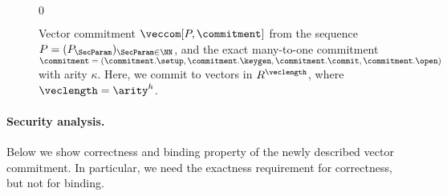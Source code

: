 \begin{figure}[t]
{{\begin{minipage}[t]{0.55\textwidth}
\begin{algorithmic}[1]
						\item \pcelse \pcreturn $0$
					\end{algorithmic}
				\end{minipage}
		}}
		\caption{Vector commitment $\veccom[P,\commitment]$ from the sequence $P = (P_\SecParam)_{\SecParam \in \NN}$, and the exact many-to-one commitment $\commitment = (\commitment.\setup, \commitment.\keygen,\commitment.\commit,\commitment.\open)$ with arity $\kappa$. Here, we commit to vectors in $R^\veclength$, where $\veclength = \arity^h$.}\label{fig:vectorcommitment}
	\end{figure}
	
	\paragraph{Security analysis.} Below we show correctness and binding property of the newly described vector commitment. In particular, we need the exactness requirement for correctness, but not for binding.

